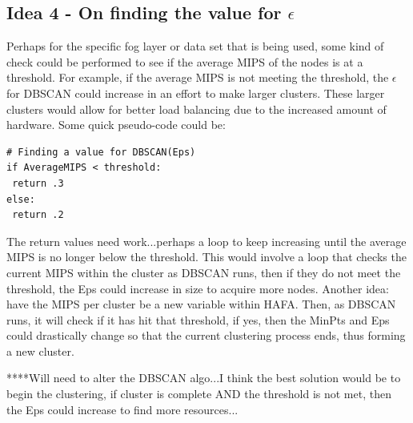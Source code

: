 \documentclass[letterpaper,twocolumn,10pt]{article}
\begin{document}
\subsection{Idea 4 - On finding the value for $\epsilon$}
Perhaps for the specific fog layer or data set that is being used, some kind of check could be performed to see if the average MIPS of the nodes is at a threshold. For example, if the average MIPS is not meeting the threshold, the $\epsilon$ for DBSCAN could increase in an effort to make larger clusters. These larger clusters would allow for better load balancing due to the increased amount of hardware. Some quick pseudo-code could be:
\begin{verbatim}
# Finding a value for DBSCAN(Eps)
if AverageMIPS < threshold:
 return .3
else:
 return .2
\end{verbatim}
 The return values need work...perhaps a loop to keep increasing until the average MIPS is no longer below the threshold. This would involve a loop that checks the current MIPS within the cluster as DBSCAN runs, then if they do not meet the threshold, the Eps could increase in size to acquire more nodes. Another idea: have the MIPS per cluster be a new variable within HAFA. Then, as DBSCAN runs, it will check if it has hit that threshold, if yes, then the MinPts and Eps could drastically change so that the current clustering process ends, thus forming a new cluster.
 
 ****Will need to alter the DBSCAN algo...I think the best solution would be to begin the clustering, if cluster is complete AND the threshold is not met, then the Eps could increase to find more resources...
\end{document}
